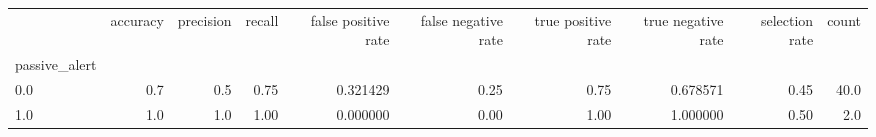 \begin{tabular}{lrrrrrrrrr}
\toprule
{} &  accuracy &  precision &  recall &  false positive rate &  false negative rate &  true positive rate &  true negative rate &  selection rate &  count \\
passive\_alert &           &            &         &                      &                      &                     &                     &                 &        \\
\midrule
0.0           &       0.7 &        0.5 &    0.75 &             0.321429 &                 0.25 &                0.75 &            0.678571 &            0.45 &   40.0 \\
1.0           &       1.0 &        1.0 &    1.00 &             0.000000 &                 0.00 &                1.00 &            1.000000 &            0.50 &    2.0 \\
\bottomrule
\end{tabular}
